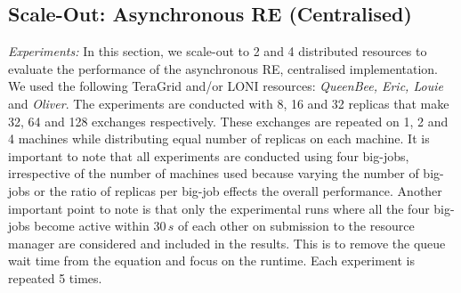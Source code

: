 \documentclass{rspublic}
\newcommand{\alnote}[1]{ {\textcolor{blue} { ***andre: #1 }}}
\newcommand{\alnote}[1]{}
\begin{document}
\subsection{Scale-Out: Asynchronous RE (Centralised)}
{\it Experiments:} In this section, we scale-out to 2 and 4
distributed resources to evaluate the performance of the asynchronous
RE, centralised implementation.  We used the following TeraGrid and/or
LONI resources: \emph{QueenBee, Eric, Louie} and \emph{Oliver}. The
experiments are conducted with 8, 16 and 32 replicas that make 32, 64
and 128 exchanges respectively. These exchanges are repeated on 1, 2
and 4 machines while distributing equal number of replicas on each
machine. It is important to note that all experiments are conducted
using four big-jobs, irrespective of the number of machines used
because varying the number of big-jobs or the ratio of replicas per
big-job effects the overall performance.  Another important point to
note is that only the experimental runs where all the four
big-jobs %
become active within $30\,s$ of each other on submission to the
resource manager are considered and included in the results. This is
to remove the queue wait time from the equation and focus on the
runtime. Each experiment is repeated 5 times.

%
\end{document}
